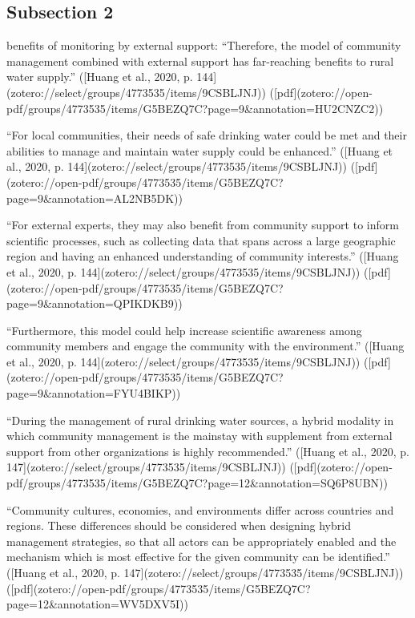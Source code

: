 
\subsection{Subsection 2}
benefits of monitoring by external support:
“Therefore, the model of community management combined with external support has far-reaching benefits to rural water supply.” ([Huang et al., 2020, p. 144](zotero://select/groups/4773535/items/9CSBLJNJ)) ([pdf](zotero://open-pdf/groups/4773535/items/G5BEZQ7C?page=9&annotation=HU2CNZC2))

“For local communities, their needs of safe drinking water could be met and their abilities to manage and maintain water supply could be enhanced.” ([Huang et al., 2020, p. 144](zotero://select/groups/4773535/items/9CSBLJNJ)) ([pdf](zotero://open-pdf/groups/4773535/items/G5BEZQ7C?page=9&annotation=AL2NB5DK))

“For external experts, they may also benefit from community support to inform scientific processes, such as collecting data that spans across a large geographic region and having an enhanced understanding of community interests.” ([Huang et al., 2020, p. 144](zotero://select/groups/4773535/items/9CSBLJNJ)) ([pdf](zotero://open-pdf/groups/4773535/items/G5BEZQ7C?page=9&annotation=QPIKDKB9))

“Furthermore, this model could help increase scientific awareness among community members and engage the community with the environment.” ([Huang et al., 2020, p. 144](zotero://select/groups/4773535/items/9CSBLJNJ)) ([pdf](zotero://open-pdf/groups/4773535/items/G5BEZQ7C?page=9&annotation=FYU4BIKP))

“During the management of rural drinking water sources, a hybrid modality in which community management is the mainstay with supplement from external support from other organizations is highly recommended.” ([Huang et al., 2020, p. 147](zotero://select/groups/4773535/items/9CSBLJNJ)) ([pdf](zotero://open-pdf/groups/4773535/items/G5BEZQ7C?page=12&annotation=SQ6P8UBN))

“Community cultures, economies, and environments differ across countries and regions. These differences should be considered when designing hybrid management strategies, so that all actors can be appropriately enabled and the mechanism which is most effective for the given community can be identified.” ([Huang et al., 2020, p. 147](zotero://select/groups/4773535/items/9CSBLJNJ)) ([pdf](zotero://open-pdf/groups/4773535/items/G5BEZQ7C?page=12&annotation=WV5DXV5I))

